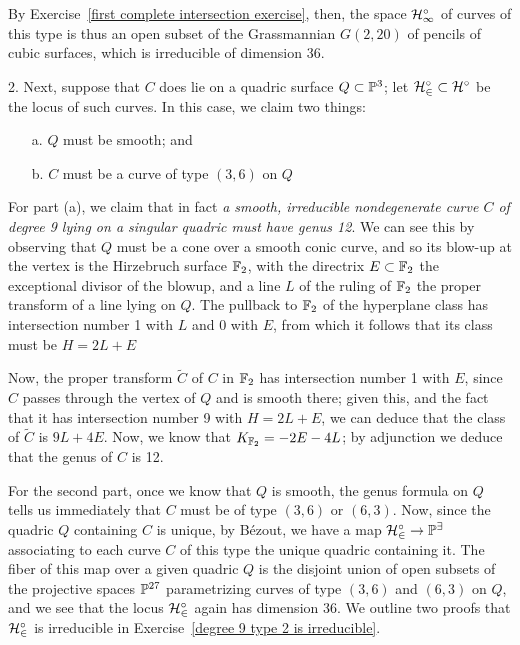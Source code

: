 By Exercise~\ref{first complete intersection exercise}, then, the space $\cal H^\circ_1$ of curves of this type is thus an open subset of the Grassmannian $G(2,20)$ of pencils of cubic surfaces, which is irreducible of dimension 36.

2. Next, suppose that $C$ does lie on a quadric surface $Q \subset {\mathbb P}^3$; let $\cal H^\circ_2 \subset \cal H^\circ$ be the locus of such curves. In this case, we claim two things:
\begin{enumerate}
\item[a.] $Q$ must be smooth; and
\item[b.] $C$ must be a curve of type $(3,6)$ on $Q$
\end{enumerate}

For part (a), we claim that in fact \emph{a smooth, irreducible nondegenerate curve $C$ of degree 9 lying on a singular quadric must have genus 12}. We can see this by observing that $Q$ must be a cone over a smooth conic curve, and so its blow-up at the vertex is the Hirzebruch surface ${\mathbb F}_2$, with the directrix $E \subset {\mathbb F}_2$ the exceptional divisor of the blowup, and a line $L$ of the ruling of ${\mathbb F}_2$ the proper transform of a line lying on $Q$. The pullback to ${\mathbb F}_2$ of the hyperplane class has intersection number 1 with $L$ and 0 with $E$, from which it follows that its class must  be $H = 2L + E$

Now, the proper transform $\tilde C$ of $C$ in ${\mathbb F}_2$ has intersection number 1 with $E$, since $C$ passes through the vertex of $Q$ and is smooth there; given this, and the fact that it has intersection number 9 with $H = 2L+E$, we can deduce that the class of $\tilde C$ is $9L + 4E$. Now, we know that $K_{{\mathbb F}_2} = -2E - 4L$; by adjunction we deduce that  the genus of $C$ is 12.

For the second part, once we know that $Q$ is smooth, the genus formula on $Q$ tells us immediately that $C$ must be of type $(3,6)$ or $(6,3)$. Now, since the quadric $Q$ containing $C$ is unique, by B\'ezout, we have a map $\cal H^\circ_2 \to {\mathbb P}^9$ associating to each curve $C$ of this type the unique quadric containing it. The fiber of this map over a given quadric $Q$ is the disjoint union of open subsets of the projective spaces ${\mathbb P}^{27}$ parametrizing curves of type $(3,6)$ and $(6,3)$ on $Q$, and we see that the locus $\cal H^\circ_2$ again has dimension 36. We outline two proofs that 
$\cal H^\circ_2$ is irreducible in Exercise~\ref{degree 9 type 2 is irreducible}.



